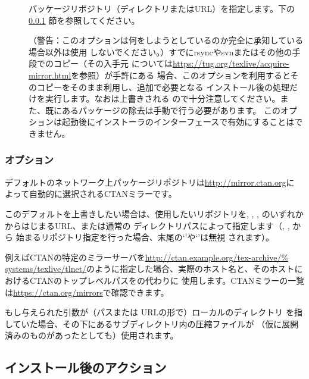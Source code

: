 \documentclass[uplatex,dvipdfmx]{jsarticle}
\begin{document}
\begin{description}
\item[]
パッケージリポジトリ（ディレクトリまたはURL）を指定します。下の\ref{sec:location}%
節を参照してください。

\item[]
（警告：このオプションは何をしようとしているのか完全に承知している場合以外は使用
しないでください。）すでにrsyncやsvnまたはその他の手段で\TL のコピー（その入手元
については\url{https://tug.org/texlive/acquire-mirror.html}を参照）が手許にある
場合、このオプションを利用するとそのコピーをそのまま利用し、追加で必要となる
インストール後の処理だけを実行します。なおは上書きされる
ので十分注意してください。また、既にあるパッケージの除去は手動で行う必要があります。
このオプションは起動後にインストーラのインターフェースで有効にすることはできません。
\end{description}

\subsubsection{オプション}
\label{sec:location}

デフォルトのネットワーク上パッケージリポジトリは\url{http://mirror.ctan.org}に
よって自動的に選択されるCTANミラーです。

このデフォルトを上書きしたい場合は、使用したいリポジトリを, , , のいずれかからはじまるURL、または通常の
ディレクトリパスによって指定します（, , から
始まるリポジトリ指定を行った場合、末尾の`\code{/}'や`'は無視
されます）。

例えばCTANの特定のミラーサーバを\url{http://ctan.example.org/tex-archive/%
systems/texlive/tlnet/}のように指定した場合、実際のホスト名と、そのホストに
おけるCTANのトップレベルパスをの代わりに
使用します。CTANミラーの一覧は\url{https://ctan.org/mirrors}で確認できます。

もし与えられた引数が（パスまたは URLの形で）ローカルのディレクトリ
を指していた場合、その下にあるサブディレクトリ内の圧縮ファイルが
（仮に展開済みのものがあったとしても）使用されます。

\subsection{インストール後のアクション}
\label{sec:postinstall}
\end{document}
